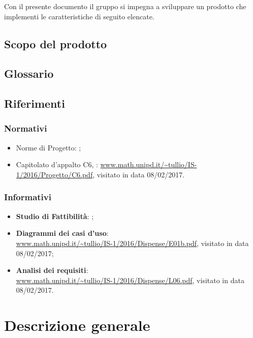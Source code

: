 Con il presente documento il gruppo \hx{} si impegna a sviluppare un prodotto che implementi le caratteristiche di seguito elencate.

\subsection{Scopo del prodotto}
\scopo

\subsection{Glossario}
\presgloss

\subsection{Riferimenti}
\subsubsection{Normativi}
\begin{itemize}
	\item Norme di Progetto: \NdP;
	\item Capitolato d'appalto C6, \proj: \url{www.math.unipd.it/~tullio/IS-1/2016/Progetto/C6.pdf}, visitato in data 08/02/2017.
\end{itemize}

\subsubsection{Informativi}
\begin{itemize}
	\item \textbf{Studio di Fattibilità}: \SdF;
	\item \textbf{Diagrammi dei casi d'uso}: \\
	\url{www.math.unipd.it/~tullio/IS-1/2016/Dispense/E01b.pdf}, visitato in data 08/02/2017;
	\item \textbf{Analisi dei requisiti}: \\
	\url{www.math.unipd.it/~tullio/IS-1/2016/Dispense/L06.pdf}, visitato in data 08/02/2017.
\end{itemize}






\section{Descrizione generale}

